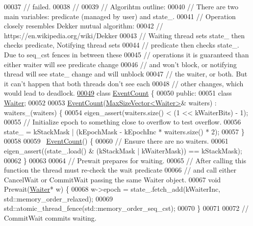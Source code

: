 \begin{DoxyCode}
00037 \textcolor{comment}{// failed.}
00038 \textcolor{comment}{//}
00039 \textcolor{comment}{// Algorihtm outline:}
00040 \textcolor{comment}{// There are two main variables: predicate (managed by user) and state\_.}
00041 \textcolor{comment}{// Operation closely resembles Dekker mutual algorithm:}
00042 \textcolor{comment}{// https://en.wikipedia.org/wiki/Dekker%
00043 \textcolor{comment}{// Waiting thread sets state\_ then checks predicate, Notifying thread sets}
00044 \textcolor{comment}{// predicate then checks state\_. Due to seq\_cst fences in between these}
00045 \textcolor{comment}{// operations it is guaranteed than either waiter will see predicate change}
00046 \textcolor{comment}{// and won't block, or notifying thread will see state\_ change and will unblock}
00047 \textcolor{comment}{// the waiter, or both. But it can't happen that both threads don't see each}
00048 \textcolor{comment}{// other changes, which would lead to deadlock.}
\hyperlink{class_eigen_1_1_event_count}{00049} \textcolor{keyword}{class }\hyperlink{class_eigen_1_1_event_count}{EventCount} \{
00050  \textcolor{keyword}{public}:
00051   \textcolor{keyword}{class }\hyperlink{class_eigen_1_1_event_count_1_1_waiter}{Waiter};
00052 
00053   \hyperlink{class_eigen_1_1_event_count}{EventCount}(\hyperlink{class_eigen_1_1_max_size_vector}{MaxSizeVector<Waiter>}& waiters) : waiters\_(waiters) \{
00054     eigen\_assert(waiters.size() < (1 << kWaiterBits) - 1);
00055     \textcolor{comment}{// Initialize epoch to something close to overflow to test overflow.}
00056     state\_ = kStackMask | (kEpochMask - kEpochInc * waiters.size() * 2);
00057   \}
00058 
00059   ~\hyperlink{class_eigen_1_1_event_count}{EventCount}() \{
00060     \textcolor{comment}{// Ensure there are no waiters.}
00061     eigen\_assert((state\_.load() & (kStackMask | kWaiterMask)) == kStackMask);
00062   \}
00063 
00064   \textcolor{comment}{// Prewait prepares for waiting.}
00065   \textcolor{comment}{// After calling this function the thread must re-check the wait predicate}
00066   \textcolor{comment}{// and call either CancelWait or CommitWait passing the same Waiter object.}
00067   \textcolor{keywordtype}{void} Prewait(\hyperlink{class_eigen_1_1_event_count_1_1_waiter}{Waiter}* w) \{
00068     w->epoch = state\_.fetch\_add(kWaiterInc, std::memory\_order\_relaxed);
00069     std::atomic\_thread\_fence(std::memory\_order\_seq\_cst);
00070   \}
00071 
00072   \textcolor{comment}{// CommitWait commits waiting.}
}
\end{DoxyCode}
